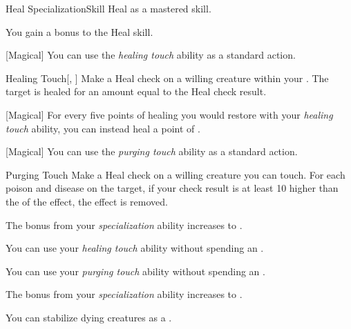     \begin{feat}{Heal Specialization}{Skill}
        \featpre Heal as a mastered skill.

         You gain a  bonus to the Heal skill.

        [Magical] You can use the \textit{healing touch} ability as a standard action.
        \begin{apability}{Healing Touch}[, ]
            Make a Heal check on a willing creature within your .
            The target is healed for an amount equal to the Heal check result.
        \end{apability}

        [Magical] For every five points of healing you would restore with your \textit{healing touch} ability, you can instead heal a point of .

        [Magical] You can use the \textit{purging touch} ability as a standard action.
        \begin{apability}{Purging Touch}
            Make a Heal check on a willing creature you can touch.
            For each poison and disease on the target, if your check result is at least 10 higher than the  of the effect, the effect is removed.
        \end{apability}

         The bonus from your \textit{specialization} ability increases to .

         You can use your \textit{healing touch} ability without spending an .

         You can use your \textit{purging touch} ability without spending an .

         The bonus from your \textit{specialization} ability increases to .

         You can stabilize dying creatures as a .
    \end{feat}

